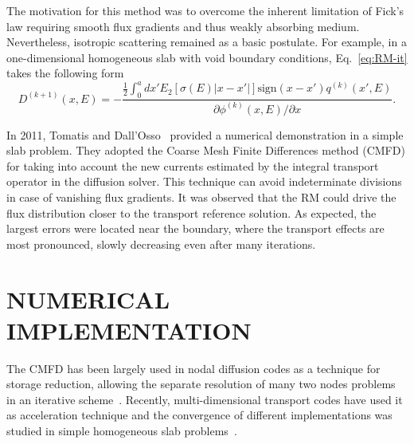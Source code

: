 \documentclass[letterpaper]{physor2020}
\begin{document}
The motivation for this method was to overcome the inherent limitation of Fick's law requiring smooth flux gradients and thus weakly absorbing medium. Nevertheless, isotropic scattering remained as a basic postulate. For example, in a one-dimensional homogeneous slab with void boundary conditions, Eq.~\eqref{eq:RM-it} takes the following form~\cite{Ronen-2004}
\begin{equation}\label{eq:RM-it-1D-slab}
D^{(k+1)}(x,E) = -\frac{\frac{1}{2}\int_0^a dx' E_2[\sigma(E)\lvert
	x-x'\rvert]\text{sign}(x-x')q^{(k)}(x',E)}
{\partial \phi^{(k)}(x,E)/\partial x}.
\end{equation}

In 2011, Tomatis and Dall'Osso~\cite{Tomatis-2011} provided a numerical demonstration in a simple slab problem. They adopted the Coarse Mesh Finite Differences method (CMFD) for taking into account the new currents estimated by the integral transport operator in the diffusion solver.
%
%
This technique can avoid indeterminate divisions in case of vanishing flux gradients. It was observed that the RM could drive the flux distribution closer to the transport reference solution. As expected, the largest errors were located near the boundary, where the transport effects are most pronounced, slowly decreasing even after many iterations.%


\section{NUMERICAL IMPLEMENTATION}
\label{sec:RM-num}

The CMFD has been largely used in nodal diffusion codes as a technique for storage reduction, allowing the separate resolution of many two nodes problems in an iterative scheme~\cite{Smith-1983,Lawrence-1986}. Recently, multi-dimensional transport codes have used it as acceleration technique and the convergence of different implementations was studied in simple homogeneous slab problems~\cite{Jarrett-2016,Shen-2019}.
\end{document}
